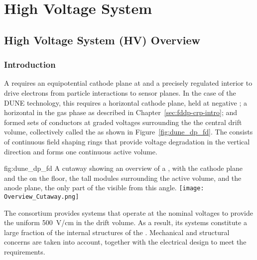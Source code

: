 \chapter{High Voltage System}
\label{ch:fddp-hv}

\section{High Voltage System (HV) Overview}
\label{sec:fddp-hv-ov}


\subsection{Introduction}
\label{sec:fddp-hv-intro}

A  requires an equipotential cathode plane at  and a precisely regulated interior \efield to drive 
electrons from particle interactions to sensor planes.  In the case of the DUNE  technology, 
this requires a horizontal cathode plane, held at negative ; a horizontal  in the gas phase as described in  Chapter~\ref{sec:fddp-crp-intro}; and formed sets of conductors at graded voltages surrounding the
 the central drift volume, collectively called the  as shown in Figure~\ref{fig:dune_dp_fd}. The  consists of continuous field shaping rings that provide voltage degradation in the vertical direction and forms one continuous active volume.


\begin{dunefigure}{fig:dune_dp_fd}
{A cutaway showing an overview of a , with the cathode plane and the  on the floor, the \tpcheight tall  modules surrounding the active volume, and the anode plane, the only part of the  visible from this angle.}
\texttt{[image: Overview\_Cutaway.png]}
\end{dunefigure}

The  consortium provides systems that operate at the nominal voltages to provide the uniform \SI{500}{V/cm} \efield in the  drift volume. As a result, its systems %
constitute a large fraction of the %
internal structures of the . %
Mechanical and structural concerns are taken into account, together with the electrical design to meet the requirements. 

